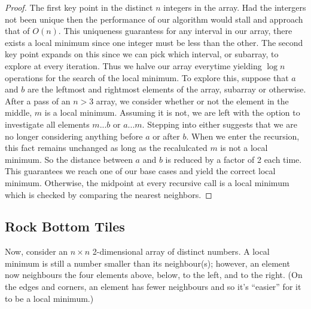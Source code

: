 \documentclass[11pt, oneside]{article}   	%
\theoremstyle{definition}
\theoremstyle{remark}
\begin{document}
\begin{enumerate}
   \begin{proof}
   The first key point in the distinct $n$ integers in the array. Had the intergers not been unique then the performance of our algorithm would stall and approach that of $ O(n)$. This uniqueness guarantess for any interval in our array, there exists a local minimum since one integer must be less than the other. The second key point expands on this since we can pick which interval, or subarray, to explore at every iteration. Thus we halve our array everytime yielding $\log n$ operations for the search of the local minimum. To explore this, suppose that $a$ and $b$ are the leftmost and rightmost elements of the array, subarray or otherwise. After a pass of an $n > 3$ array, we consider whether or not the element in the middle, $m$ is a local minimum. Assuming it is not, we are left with the option to investigate all elements $m...b$ or $a...m$. Stepping into either suggests that we are no longer considering anything before $a$ or after $b$. When we enter the recursion, this fact remains unchanged as long as the recalulcated $m$ is not a local minimum. So the distance between $a$ and $b$ is reduced by a factor of 2 each time. This guarantees we reach one of our base cases and yield the correct local minimum. Otherwise, the midpoint at every recursive call is a local minimum which is checked by comparing the nearest neighbors. 
   \end{proof}
\end{enumerate}
\subsection{Rock Bottom Tiles}
\label{sec-3-1}

Now, consider an $n\times n$ 2-dimensional array of distinct
numbers. A local minimum is still a number smaller than its
neighbour(s); however, an element now neighbours the four elements
above, below, to the left, and to the right. (On the edges and
corners, an element has fewer neighbours and so it's ``easier'' for it
to be a local minimum.)
\end{document}

